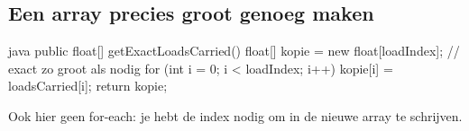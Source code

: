 \documentclass[a4paper,11pt]{article}
\begin{document}
\subsection{Een array precies groot genoeg maken}

\begin{codeblock}{java}
    public float[] getExactLoadsCarried()
    {
            float[] kopie = new float[loadIndex];   // exact zo groot als nodig
            for (int i = 0; i < loadIndex; i++)
            {
                    kopie[i] = loadsCarried[i];
                }
            return kopie;
        }
\end{codeblock}

Ook hier geen for-each: je hebt de index nodig om in de nieuwe array te
schrijven.
\end{document}
